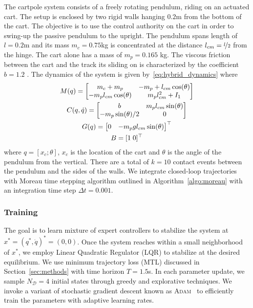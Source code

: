 The cartpole system consists of a freely rotating pendulum, riding on an
actuated cart.
%
The setup is enclosed by two rigid walls hanging $0.2$m from the bottom of the
cart.
%
The objective is to use the control authority on the cart in order to swing-up
the passive pendulum to the upright.
%
The pendulum spans length of $l=0.2$m and its mass $m_c = 0.75$kg is
concentrated at the distance $l_{cm}=\nicefrac{l}{2}$ from the hinge.
%
The cart alone has a mass of $m_p=0.165$ kg. The viscous friction between the
cart and the track its sliding on is characterized by the coefficient $b=1.2$
.
%
The dynamics of the system
is given by~\eqref{eq:hybrid_dynamics} where 
\begin{equation}
    \begin{gathered}
        M(q) = \begin{bmatrix}m_c + m_p & -m_p+l_{cm} \cos(\theta) \\
        -m_pl_{cm}\cos(\theta) & m_p l_{cm}^2+I_1\end{bmatrix} \\
        C(q, \dot{q}) = \begin{bmatrix}b  & m_pl_{cm}\sin(\theta) \\
                -m_p\sin(\theta)/2 & 0\end{bmatrix} \\
        G(q) = \begin{bmatrix}0 & -m_pg l_{cm} \sin(\theta)\end{bmatrix}^\top \\
        B = [1 \; 0]^\top
    \end{gathered}
\end{equation}
\noindent where $q = [x_c; \theta]$, $x_c$ is the location of the cart and
$\theta$ is the angle of the pendulum from the vertical. 
%
There are a total of $k=10$ contact events between the pendulum and the sides of
the walls.
%
We integrate closed-loop trajectories with Moreau time stepping algorithm
outlined in Algorithm~\eqref{algo:moreau} with an integration time step $\Delta
t=0.001$.
%

\subsubsection{Training}
\label{sssec:cartpole_training}

The goal is to learn mixture of expert controllers to stabilize the system at
$x^* = (q^*, \dot{q})^* = (0, 0)$.
%
Once the system reaches within a small neighborhood of $x^*$, we employ Linear
Quadratic Regulator (LQR) to stabilize at the desired equilibrium.
%
We use minimum trajectory loss (MTL) discussed
in Section~\ref{sec:methods} with time horizon $T=1.5$s.
%
In each parameter update, we sample $N_{\mathcal{D}}=4$ initial states through
greedy and explorative techniques.
%
We invoke a variant of stochastic gradient descent known as
\textsc{Adam}~\cite{kingma2014adam} to efficiently train the parameters with
adaptive learning rates.


